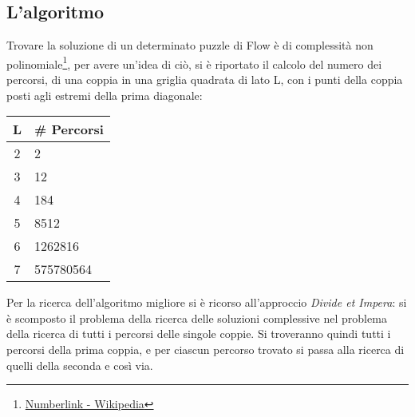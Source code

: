 \documentclass[11pt,a4paper,twocolumn]{IEEEtran}
\newcommand{\mysvg}[2]{}
\newcounter{algoritmo}
\begin{document}
		\subsection*{L'algoritmo}
		Trovare la soluzione di un determinato puzzle di Flow è di complessità non polinomiale\footnote{\href{https://en.wikipedia.org/wiki/Numberlink\#Computational_complexity}{Numberlink - Wikipedia}}, per avere un'idea di ciò, si è riportato il calcolo del numero dei percorsi, di una coppia in una griglia quadrata di lato L, con i punti della coppia posti agli estremi della prima diagonale:\\
		\vspace*{-0.2cm}
		\begin{center}
		\begin{tabular}{|c|l|}
			\hline 
			\textbf{\quad L\quad } & \textbf{\# Percorsi} \\ 
			\hline 
			2 & 2 \\ 
			\hline 
			3 & 12 \\ 
			\hline 
			4 & 184 \\ 
			\hline 
			5 & 8512 \\ 
			\hline 
			6 & 1262816 \\ 
			\hline 
			7 & 575780564 \quad\\ 
			\hline 
		\end{tabular}
		\end{center}
	\begin{figure}[h]
		\qquad\quad\text{ }
		\centering
		\mysvg{npaths}{5}
	\end{figure}
    \vspace*{-1.6cm}
	Per la ricerca dell'algoritmo migliore si è ricorso all'approccio \textit{Divide et Impera}: si è scomposto il problema della ricerca delle soluzioni complessive nel problema della ricerca di tutti i percorsi delle singole coppie. Si troveranno quindi tutti i percorsi della prima coppia, e per ciascun percorso trovato si passa alla ricerca di quelli della seconda e così via.\\
\end{document}
